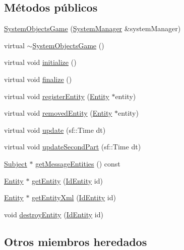 \subsection*{Métodos públicos}
\begin{DoxyCompactItemize}
\item 
\hyperlink{classSystemObjectsGame_a8f9dff3f4bc88ebbd64094241448633c}{System\+Objects\+Game} (\hyperlink{classSystemManager}{System\+Manager} \&system\+Manager)
\item 
virtual \hyperlink{classSystemObjectsGame_ae32e62e6afe1c353a8c888d15324f01e}{$\sim$\+System\+Objects\+Game} ()
\item 
virtual void \hyperlink{classSystemObjectsGame_a1d915c3471432c344a58af523085b87f}{initialize} ()
\item 
virtual void \hyperlink{classSystemObjectsGame_a4357e0e5d2e42a6b3e80362cbfdbda39}{finalize} ()
\item 
virtual void \hyperlink{classSystemObjectsGame_a6d8cbcab3b14a4ddc4c45ebe0c7aed07}{register\+Entity} (\hyperlink{classEntity}{Entity} $\ast$entity)
\item 
virtual void \hyperlink{classSystemObjectsGame_ae716ba020dded37eb7cc01e3dab32a1a}{removed\+Entity} (\hyperlink{classEntity}{Entity} $\ast$entity)
\item 
virtual void \hyperlink{classSystemObjectsGame_a6836f71bd70b620d8b86b98e6e3ee44b}{update} (sf\+::\+Time dt)
\item 
virtual void \hyperlink{classSystemObjectsGame_ad238ad4e70fb3cc2a5648a7176e69233}{update\+Second\+Part} (sf\+::\+Time dt)
\item 
\hyperlink{classSubject}{Subject} $\ast$ \hyperlink{classSystemObjectsGame_a7d1bed32c2cb7ffc4731c21491668e6b}{get\+Message\+Entities} () const 
\item 
\hyperlink{classEntity}{Entity} $\ast$ \hyperlink{classSystemObjectsGame_a27f5cdf50a6091f3b44bf5232f30455d}{get\+Entity} (\hyperlink{classIdEntity}{Id\+Entity} id)
\item 
\hyperlink{classEntity}{Entity} $\ast$ \hyperlink{classSystemObjectsGame_ae8adeb2489ef7e3f8bde37d1c7cb4653}{get\+Entity\+Xml} (\hyperlink{classIdEntity}{Id\+Entity} id)
\item 
void \hyperlink{classSystemObjectsGame_a86d70dfc35a07455330789de8503b153}{destroy\+Entity} (\hyperlink{classIdEntity}{Id\+Entity} id)
\end{DoxyCompactItemize}
\subsection*{Otros miembros heredados}


